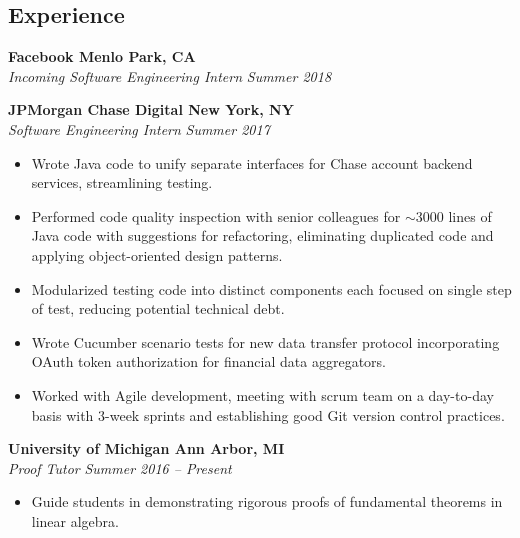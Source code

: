 \documentclass[margin,line]{resume}
\begin{document}
\begin{resume}
	\section{\mysidestyle Experience}
	
	\textbf{Facebook \hfill Menlo Park, CA} \\\vspace{1mm}%
	\textsl{Incoming Software Engineering Intern} \hfill \textsl{Summer 2018}
	\vspace{-3.5mm}
	
	\textbf{JPMorgan Chase Digital \hfill New York, NY} \\\vspace{1mm}%
	\textsl{Software Engineering Intern} \hfill \textsl{Summer 2017}
	\begin{itemize}[leftmargin=4mm]
		\item Wrote Java code to unify separate interfaces for Chase account backend services, streamlining testing.
		\item Performed code quality inspection with senior colleagues for $\sim3000$ lines of Java code with suggestions for refactoring, eliminating duplicated code and applying object-oriented design patterns.
		\item Modularized testing code into distinct components each focused on single step of test, reducing potential technical debt.
		\item Wrote Cucumber scenario tests for new data transfer protocol incorporating OAuth token authorization for financial data aggregators.
		\item Worked with Agile development, meeting with scrum team on a day-to-day basis with $3$-week sprints and establishing good Git version control practices.
	\end{itemize}
	
	\vspace{-1.5mm}
	\textbf{University of Michigan \hfill Ann Arbor, MI} \\\vspace{1mm}%
	\textsl{Proof Tutor} \hfill \textsl{Summer 2016 -- Present}
	\begin{itemize}[leftmargin=4mm]
		\item Guide students in demonstrating rigorous proofs of fundamental theorems in linear algebra.
	\end{itemize}
	\vspace{1.5mm}


\end{resume}
\end{document}
